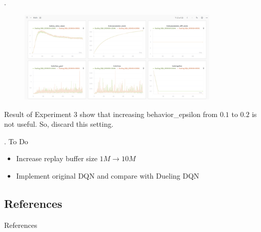 \documentclass[8pt]{beamer}
\begin{document}
\begin{frame}{.}
    \begin{figure}
        \includegraphics[width=0.85\textwidth]{Exp3_2.png}
    \end{figure}

    Result of Experiment 3 show that increasing behavior\_epsilon from $0.1$ to $0.2$ is not useful.
    So, discard this setting.
\end{frame}

\begin{frame}{.}
    To Do
    \begin{itemize}
        \item Increase replay buffer size $1M \to 10M$
        \item Implement original DQN and compare with Dueling DQN
    \end{itemize}
\end{frame}


\subsection{References}
\begin{frame}[allowframebreaks]{References}
  \printbibliography
\end{frame}
\end{document}
